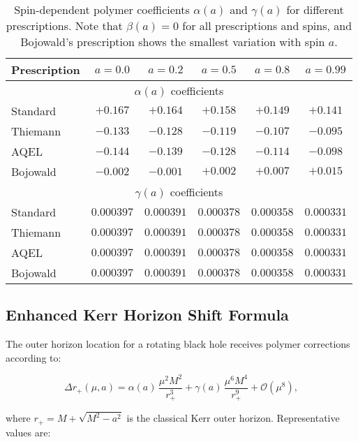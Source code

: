 \documentclass[11pt]{article}
\begin{document}
\begin{table}[h]
\centering
\begin{tabular}{|l|c|c|c|c|c|}
\hline
\textbf{Prescription} & \textbf{$a=0.0$} & \textbf{$a=0.2$} & \textbf{$a=0.5$} & \textbf{$a=0.8$} & \textbf{$a=0.99$} \\
\hline
\multicolumn{6}{|c|}{$\alpha(a)$ coefficients} \\
\hline
Standard & $+0.167$ & $+0.164$ & $+0.158$ & $+0.149$ & $+0.141$ \\
Thiemann & $-0.133$ & $-0.128$ & $-0.119$ & $-0.107$ & $-0.095$ \\
AQEL & $-0.144$ & $-0.139$ & $-0.128$ & $-0.114$ & $-0.098$ \\
Bojowald & $-0.002$ & $-0.001$ & $+0.002$ & $+0.007$ & $+0.015$ \\
\hline
\multicolumn{6}{|c|}{$\gamma(a)$ coefficients} \\
\hline
Standard & $0.000397$ & $0.000391$ & $0.000378$ & $0.000358$ & $0.000331$ \\
Thiemann & $0.000397$ & $0.000391$ & $0.000378$ & $0.000358$ & $0.000331$ \\
AQEL & $0.000397$ & $0.000391$ & $0.000378$ & $0.000358$ & $0.000331$ \\
Bojowald & $0.000397$ & $0.000391$ & $0.000378$ & $0.000358$ & $0.000331$ \\
\hline
\end{tabular}
\caption{Spin-dependent polymer coefficients $\alpha(a)$ and $\gamma(a)$ for different prescriptions. Note that $\beta(a) = 0$ for all prescriptions and spins, and Bojowald's prescription shows the smallest variation with spin $a$.}
\end{table}

\subsection{Enhanced Kerr Horizon Shift Formula}

The outer horizon location for a rotating black hole receives polymer corrections according to:

\begin{equation}
\Delta r_+(\mu,a) = \alpha(a)\,\frac{\mu^2 M^2}{r_+^3} + \gamma(a)\,\frac{\mu^6 M^4}{r_+^9} + \mathcal{O}(\mu^8),
\end{equation}

where $r_+ = M + \sqrt{M^2 - a^2}$ is the classical Kerr outer horizon. Representative values are:
\end{document}
